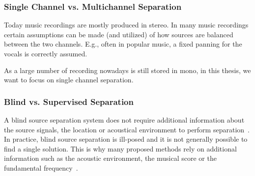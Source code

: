 \subsubsection*{Single Channel vs. Multichannel Separation}
Today music recordings are mostly produced in stereo. 
In many music recordings certain assumptions can be made (and utilized) of how sources are balanced between the two channels. 
E.g., often in popular music, a fixed panning for the vocals is correctly assumed.
\par
As a large number of recording nowadays is still stored in mono, in this thesis, we want to focus on single channel separation.

\subsubsection*{Blind vs. Supervised Separation}
A blind source separation system does not require additional information about the source signals, the location or acoustical environment to perform separation~\cite{makino07}.
In practice, blind source separation is ill-posed and it is not generally possible to find a single solution.
This is why many proposed methods rely on additional information such as the acoustic environment, the musical score or the fundamental frequency~\cite{liutkus13, ewert14}.

